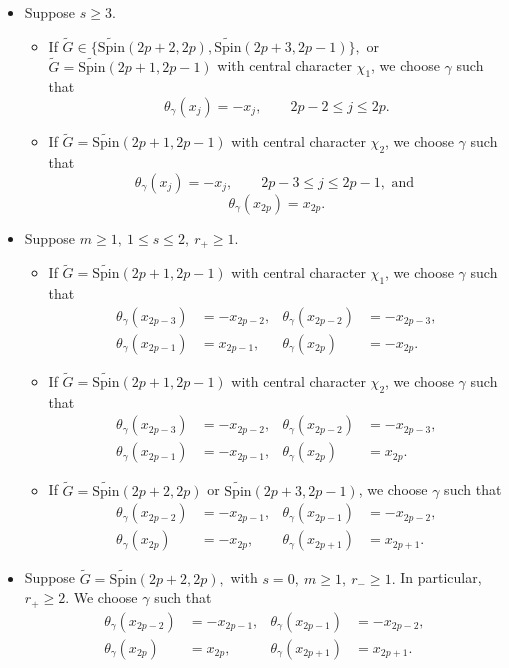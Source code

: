 \documentclass{amsart}
\newcommand{\Spin}{{\mathrm{Spin}}}
\theoremstyle{definition}
\begin{document}
\begin{itemize}

\item[(a)] Suppose \(s\geq3\).
\begin{itemize}
    \item[(i)] If
$\widetilde G\in \{\widetilde{\Spin}(2p+2,2p),
\widetilde{\Spin}(2p+3,2p-1)\},$
or
$\widetilde G=\widetilde{\Spin}(2p+1,2p-1)$
with central character $\chi_1$,
we choose \(\gamma\) such that
\[
\theta_\gamma(x_j)=-x_j,
\qquad
2p-2\leq j\leq2p.
\]
\item[(ii)] If
$\widetilde G=\widetilde{\Spin}(2p+1,2p-1)$ with central character $\chi_2$,
we choose \(\gamma\) such that
\[
\theta_\gamma(x_j)=-x_j,
\qquad
2p-3\leq j\leq2p-1, \text{ and }
\]
\[
\theta_\gamma(x_{2p})=x_{2p}.
\]
\end{itemize}
\item[(b)] Suppose
$m\geq1,\ 1\leq s\leq2,\  r_+\geq1$.
\begin{itemize}
    \item[(i)]  If
$\widetilde G=\widetilde{\Spin}(2p+1,2p-1)$ with central character \(\chi_1\), we choose \(\gamma\) such that
\begin{align*}
\theta_\gamma(x_{2p-3})&=-x_{2p-2},
&
\theta_\gamma(x_{2p-2})&=-x_{2p-3},
\\
\theta_\gamma(x_{2p-1})&=x_{2p-1},
&
\theta_\gamma(x_{2p})&=-x_{2p}.
\end{align*}
\item[(ii)] If
$\widetilde G = \widetilde{\Spin}(2p+1,2p-1)
$ with central character \(\chi_2\), we choose \(\gamma\) such that
\begin{align*}
\theta_\gamma(x_{2p-3})&=-x_{2p-2},
&
\theta_\gamma(x_{2p-2})&=-x_{2p-3},
\\
\theta_\gamma(x_{2p-1})&=-x_{2p-1},
&
\theta_\gamma(x_{2p})&=x_{2p}.
\end{align*}
\item[(iii)] If
$\widetilde G=\widetilde{\Spin}(2p+2,2p)$ or $\widetilde{\Spin}(2p+3,2p-1)$, 
we choose \(\gamma\) such that
\begin{align*}
\theta_\gamma(x_{2p-2})&=-x_{2p-1},
&
\theta_\gamma(x_{2p-1})&=-x_{2p-2},
\\
\theta_\gamma(x_{2p})&=-x_{2p},
&
\theta_\gamma(x_{2p+1})&=x_{2p+1}.
\end{align*}
\end{itemize}
\item[(c)] Suppose
$\widetilde G=\widetilde{\Spin}(2p+2,2p),$ with
$s=0,\  m\geq1,\  r_-\geq1.$
In particular, \(r_+\geq2\). We choose \(\gamma\) such that
\begin{align*}
\theta_\gamma(x_{2p-2})&=-x_{2p-1},
&
\theta_\gamma(x_{2p-1})&=-x_{2p-2},
\\
\theta_\gamma(x_{2p})&=x_{2p},
&
\theta_\gamma(x_{2p+1})&=x_{2p+1}.
\end{align*}

\end{itemize}
\end{document}
